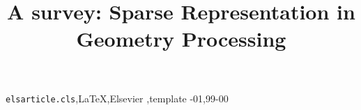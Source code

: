 \documentclass[3p,twocolumn]{elsarticle}
\begin{document}
\begin{frontmatter}

\title{A survey: Sparse Representation in Geometry Processing}
%
%
%
%

\begin{abstract}
\end{abstract}

\begin{keyword}
\texttt{elsarticle.cls}\sep \LaTeX\sep Elsevier \sep template
-01\sep  99-00
\end{keyword}

\end{frontmatter}

\linenumbers

%




%




\end{document}
